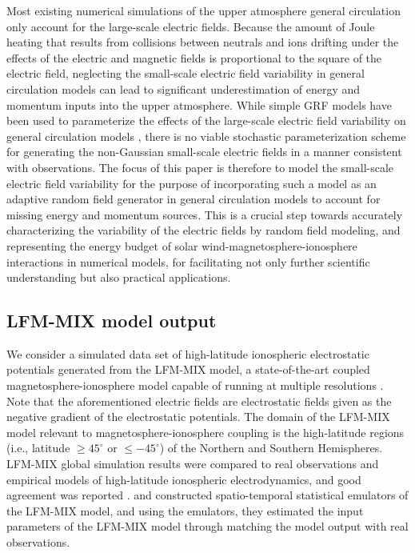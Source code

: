\documentclass[aoas,preprint]{imsart}
\numberwithin{equation}{section}
\theoremstyle{plain}
\begin{document}
Most existing numerical simulations of the upper atmosphere general circulation only account for the large-scale electric fields. Because the amount of Joule heating that results from collisions between neutrals and ions drifting under the effects of the electric and magnetic fields is proportional to the square of the electric field, neglecting the small-scale electric field variability in general circulation models can lead to significant underestimation of energy and momentum inputs into the upper atmosphere. While simple GRF models have been used to parameterize the effects of the large-scale electric field variability on general circulation models \citep{Codrescu-00, Matsuo-08}, there is no viable stochastic parameterization scheme for generating the non-Gaussian small-scale electric fields in a manner consistent with observations. The focus of this paper is therefore to model the small-scale electric field variability for the purpose of incorporating such a model as an adaptive random field generator in general circulation models to account for missing energy and momentum sources. This is a crucial step towards accurately characterizing the variability of the electric fields by random field modeling, and representing the energy budget of solar wind-magnetosphere-ionosphere interactions in numerical models, for facilitating not only further scientific understanding but also practical applications.


\subsection{LFM-MIX model output}
We consider a simulated data set of high-latitude ionospheric electrostatic potentials generated from the LFM-MIX model, a state-of-the-art coupled magnetosphere-ionosphere model \citep{Lyon-04} capable of running at multiple resolutions \citep{Wiltberger-16}. Note that the aforementioned electric fields are electrostatic fields given as the negative gradient of the electrostatic potentials. The domain of the LFM-MIX model relevant to magnetosphere-ionosphere coupling is the high-latitude regions (i.e., latitude $\geq 45^\circ$ or $\leq -45^\circ$) of the Northern and Southern Hemispheres. LFM-MIX global simulation results were compared to real observations and empirical models of high-latitude ionospheric electrodynamics, and good agreement was reported \citep{Zhang-11, Wiltberger-16, Kleiber-16}. \citet{kleiber-13} and \citet{heaton-15} constructed spatio-temporal statistical emulators of the LFM-MIX model, and using the emulators, they estimated the input parameters of the LFM-MIX model  through matching the model output with real observations.
\end{document}
